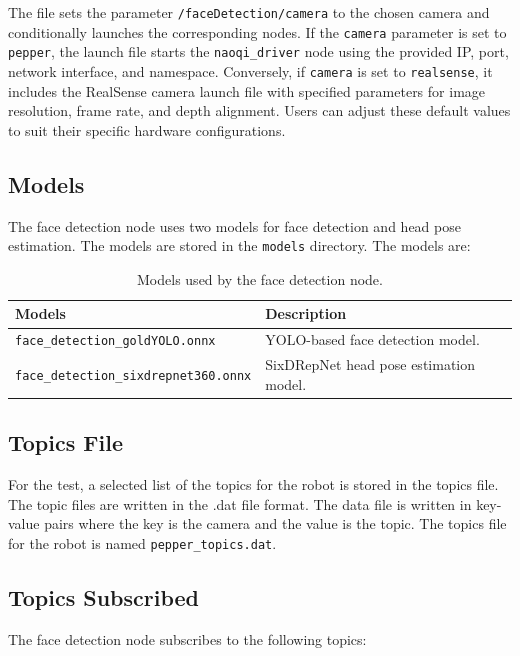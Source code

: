 \documentclass{CSSRforAfrica}
\begin{document}
{The file sets the parameter \texttt{/faceDetection/camera} to the chosen camera and conditionally launches the corresponding nodes. If the \texttt{camera} parameter is set to \texttt{pepper}, the launch file starts the \texttt{naoqi\_driver} node using the provided IP, port, network interface, and namespace. Conversely, if \texttt{camera} is set to \texttt{realsense}, it includes the RealSense camera launch file with specified parameters for image resolution, frame rate, and depth alignment. Users can adjust these default values to suit their specific hardware configurations.

\subsection*{Models}
The face detection node uses two models for face detection and head pose estimation. The models are stored in the \texttt{models} directory. The models are:
\begin{table}[h!]
	\centering
	\begin{tabularx}{\linewidth}{| l | X |}
		\hline
		\rowcolor{blue!20} %
		\textbf{Models} & \textbf{Description} \\
		\hline
		{\footnotesize \texttt{face\_detection\_goldYOLO.onnx} }  & {\footnotesize YOLO-based face detection model.} \\
		\hline
		{\footnotesize \texttt{face\_detection\_sixdrepnet360.onnx} }  & {\footnotesize SixDRepNet head pose estimation model.} \\
		\hline
	\end{tabularx}
	\caption{Models used by the face detection node.}
\end{table}

\subsection*{Topics File} 
For the test, a selected list of the topics for the robot is stored in the topics file. The topic files are 
written in the .dat file format. The data file is written in key-value pairs where the key is the camera 
and the value is the topic. The topics file for the robot is named \texttt{pepper\_topics.dat}.

\newpage
\subsection*{Topics Subscribed}
The face detection node subscribes to the following topics:

}
\end{document}
